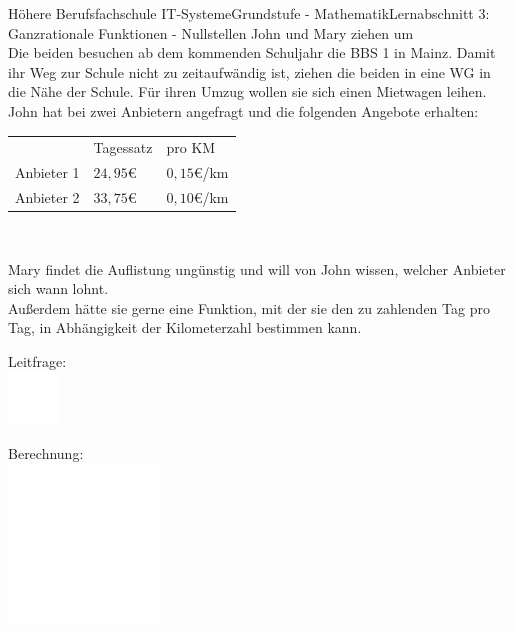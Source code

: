 \documentclass[oneside,openany,headings=optiontotoc,11pt,numbers=noenddot]{scrreprt}
\begin{document}
\begin{worksheet}{Höhere Berufsfachschule IT-Systeme}{Grundstufe - Mathematik}{Lernabschnitt 3: Ganzrationale Funktionen - Nullstellen}
		\setcounter{page}{1}
		\noindent
		\LARGE John und Mary ziehen um\\
		\normalsize
		\noindent
		Die beiden besuchen ab dem kommenden Schuljahr die BBS 1 in Mainz. Damit ihr Weg zur Schule nicht zu zeitaufwändig ist, ziehen die beiden in eine WG in die Nähe der Schule. Für ihren Umzug wollen sie sich einen Mietwagen leihen.\\
		John hat bei zwei Anbietern angefragt und die folgenden Angebote erhalten:\\
		\par\noindent
		\begin{tabularx}{\textwidth}{|l|l|l|}
			\cline{1-3}
			& Tagessatz & pro KM\\
			\cline{1-3}
			Anbieter 1 & \(24,95\)\euro{} & \(0,15\)\euro{}/km\\
			\cline{1-3}
			Anbieter 2 & \(33,75\)\euro{} & \(0,10\)\euro{}/km\\
			\cline{1-3}
		\end{tabularx}\\
		\par\noindent
		Mary findet die Auflistung ungünstig und will von John wissen, welcher Anbieter sich wann lohnt.\\
		Außerdem hätte sie gerne eine Funktion, mit der sie den zu zahlenden Tag pro Tag, in Abhängigkeit der Kilometerzahl bestimmen kann.
		\begin{framed}
			\noindent
			\small{\color{codegray}Leitfrage:}\\
			\includegraphics[width=0.1\textwidth]{../../empty.jpg}\\
		\end{framed}
		\begin{framed}
			\noindent
			\small{\color{codegray}Berechnung:}\\
			\includegraphics[width=0.3\textwidth]{../../empty.jpg}\\

\end{framed}
\end{worksheet}
\end{document}
